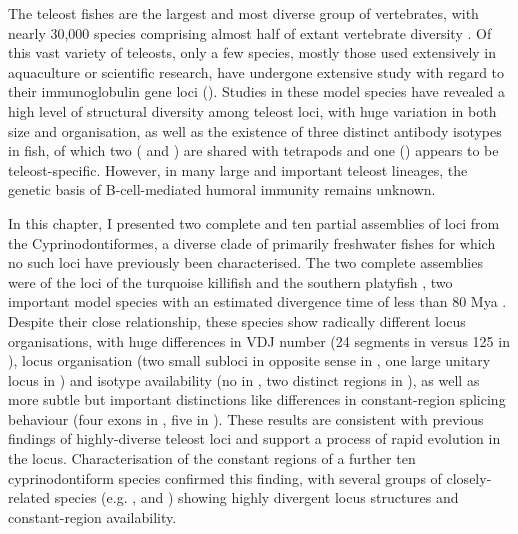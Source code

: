 The teleost fishes are the largest and most diverse group of vertebrates, with nearly 30,000 species comprising almost half of extant vertebrate diversity \parencite{ravi2018divergent}. Of this vast variety of teleosts, only a few species, mostly those used extensively in aquaculture or scientific research, have undergone extensive study with regard to their immunoglobulin gene loci (). Studies in these model species have revealed a high level of structural diversity among teleost \igh{} loci, with huge variation in both size and organisation, as well as the existence of three distinct antibody isotypes in fish, of which two ( and ) are shared with tetrapods and one () appears to be teleost-specific. However, in many large and important teleost lineages, the genetic basis of B-cell-mediated humoral immunity remains unknown.

In this chapter, I presented two complete and ten partial assemblies of \igh{} loci from the Cyprinodontiformes, a diverse clade of primarily freshwater fishes for which no such loci have previously been characterised. The two complete assemblies were of the \igh{} loci of the turquoise killifish \nfu and the southern platyfish \xma, two important model species with an estimated divergence time of less than 80 Mya \parencite{hughes2018teleostphylo}. Despite their close relationship, these species show radically different locus organisations, with huge differences in VDJ number (24 \vh segments in \Nfu versus 125 in \Xma), locus organisation (two small subloci in opposite sense in \Nfu, one large unitary locus in \Xma) and isotype availability (no  in \Nfu, two distinct  regions in \Xma), as well as more subtle but important distinctions like differences in constant-region splicing behaviour (four exons in \Nfu {}, five in \Xma). These results are consistent with previous findings of highly-diverse teleost loci and support a process of rapid evolution in the \igh{} locus. Characterisation of the constant regions of a further ten cyprinodontiform species confirmed this finding, with several groups of closely-related species (e.g. \nfu,  and ) showing highly divergent locus structures and constant-region availability.

